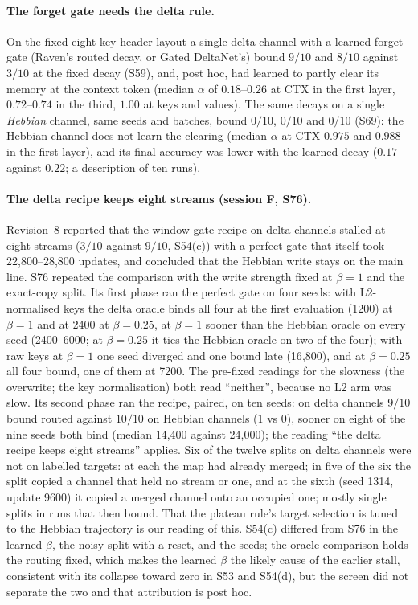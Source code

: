 \documentclass[11pt]{article}
\begin{document}
\paragraph{The forget gate needs the delta rule.} On the fixed eight-key header layout a single delta channel with a learned forget gate (Raven's routed decay, or Gated DeltaNet's) bound $9/10$ and $8/10$ against $3/10$ at the fixed decay (S59), and, post hoc, had learned to partly clear its memory at the context token (median $\alpha$ of $0.18$--$0.26$ at CTX in the first layer, $0.72$--$0.74$ in the third, $1.00$ at keys and values). The same decays on a single \emph{Hebbian} channel, same seeds and batches, bound $0/10$, $0/10$ and $0/10$ (S69): the Hebbian channel does not learn the clearing (median $\alpha$ at CTX $0.975$ and $0.988$ in the first layer), and its final accuracy was lower with the learned decay ($0.17$ against $0.22$; a description of ten runs).

\paragraph{The delta recipe keeps eight streams (session F, S76).} Revision~8 reported that the window-gate recipe on delta channels stalled at eight streams ($3/10$ against $9/10$, S54(c)) with a perfect gate that itself took 22{,}800--28{,}800 updates, and concluded that the Hebbian write stays on the main line. S76 repeated the comparison with the write strength fixed at $\beta = 1$ and the exact-copy split. Its first phase ran the perfect gate on four seeds: with L2-normalised keys the delta oracle binds all four at the first evaluation (1200) at $\beta = 1$ and at 2400 at $\beta = 0.25$, at $\beta = 1$ sooner than the Hebbian oracle on every seed (2400--6000; at $\beta = 0.25$ it ties the Hebbian oracle on two of the four); with raw keys at $\beta = 1$ one seed diverged and one bound late (16{,}800), and at $\beta = 0.25$ all four bound, one of them at 7200. The pre-fixed readings for the slowness (the overwrite; the key normalisation) both read ``neither'', because no L2 arm was slow. Its second phase ran the recipe, paired, on ten seeds: on delta channels $9/10$ bound routed against $10/10$ on Hebbian channels (1 vs 0), sooner on eight of the nine seeds both bind (median 14{,}400 against 24{,}000); the reading ``the delta recipe keeps eight streams'' applies. Six of the twelve splits on delta channels were not on labelled targets: at each the map had already merged; in five of the six the split copied a channel that held no stream or one, and at the sixth (seed 1314, update 9600) it copied a merged channel onto an occupied one; mostly single splits in runs that then bound. That the plateau rule's target selection is tuned to the Hebbian trajectory is our reading of this. S54(c) differed from S76 in the learned $\beta$, the noisy split with a reset, and the seeds; the oracle comparison holds the routing fixed, which makes the learned $\beta$ the likely cause of the earlier stall, consistent with its collapse toward zero in S53 and S54(d), but the screen did not separate the two and that attribution is post hoc.
\end{document}
